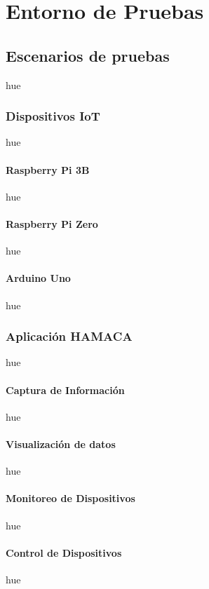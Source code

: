 

\chapter{ Entorno de Pruebas}
\section{Escenarios de pruebas}
hue

\subsection{Dispositivos IoT}
hue
\subsubsection{Raspberry Pi 3B}
hue
\subsubsection{Raspberry Pi Zero}
hue
\subsubsection{Arduino Uno}
hue

\subsection{Aplicación HAMACA}
hue
\subsubsection{Captura de Información}
hue
\subsubsection{Visualización de datos}
hue
\subsubsection{Monitoreo de Dispositivos}
hue
\subsubsection{Control de Dispositivos}
hue